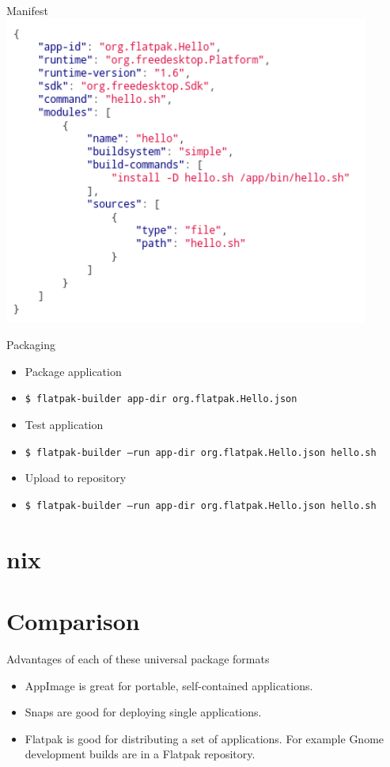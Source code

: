 \documentclass{lug}
\begin{document}
\begin{frame}{Manifest}
    \center
    \includegraphics[width=0.9\textwidth]{./graphics/flatpak_json.png}
\end{frame}

\begin{frame}{Packaging}
    \begin{itemize}
        \item Package application
        \item \texttt{\$\ flatpak-builder app-dir org.flatpak.Hello.json}
        \item Test application
        \item \texttt{\$\ flatpak-builder --run app-dir org.flatpak.Hello.json hello.sh}
        \item Upload to repository
        \item \texttt{\$\ flatpak-builder --run app-dir org.flatpak.Hello.json hello.sh}
    \end{itemize}
\end{frame}


\section{nix}

\section{Comparison}
\begin{frame}{Advantages of each of these universal package formats}
    \begin{itemize}
        \item AppImage is great for portable, self-contained applications.
        \item Snaps are good for deploying single applications.
        \item Flatpak is good for distributing a set of applications. For
            example Gnome development builds are in a Flatpak repository.
    \end{itemize}
\end{frame}
\end{document}
